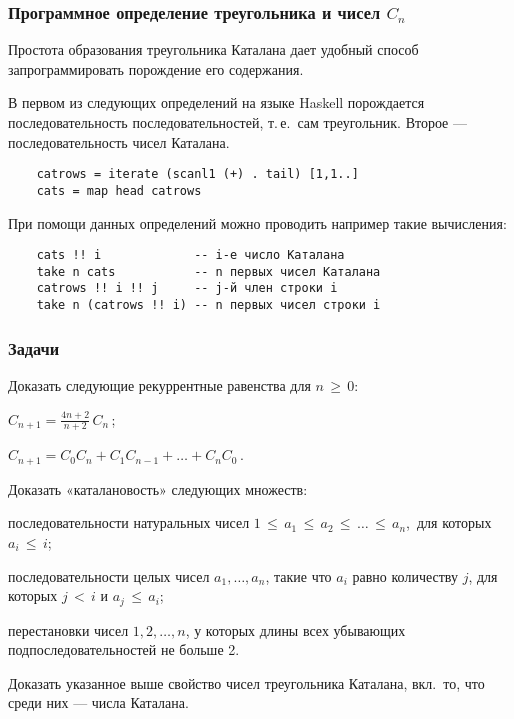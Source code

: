 \documentclass[mathserif]{beamer}
\newenvironment{items}[1][\labelitemi]{\begin{list}{#1}{\setlength{\topsep}{0pt}\setlength{\partopsep}{0pt}\setlength{\parsep}{0pt}\setlength{\itemsep}{\parskip}}}{\end{list}}
\begin{document}
\begin{frame}[fragile]%
\frametitle{Программное определение треугольника и чисел $C_n$}
Простота образования треугольника Каталана дает удобный способ запрограммировать порождение его содержания.

\medskip

В первом из следующих определений на языке Haskell порождается последовательность последовательностей, т.\,е.\ сам треугольник.
Второе — последовательность чисел Каталана.

\begin{verbatim}
    catrows = iterate (scanl1 (+) . tail) [1,1..]
    cats = map head catrows
\end{verbatim}

При помощи данных определений можно проводить например такие вычисления:

\begin{verbatim}
    cats !! i             -- i-е число Каталана
    take n cats           -- n первых чисел Каталана
    catrows !! i !! j     -- j-й член строки i
    take n (catrows !! i) -- n первых чисел строки i
\end{verbatim}
\end{frame}

\begin{frame}[fragile]%
\frametitle{Задачи}
Доказать следующие рекуррентные равенства для $n\,{\ge}\,0$:

\smallskip

\begin{items}[•]
\item $C_{n+1}=\frac{4n+2}{n+2}\,C_n$\,;
\item $C_{n+1}=C_0C_n+C_1C_{n-1}+\dots+C_nC_0$\,.
\end{items}

\bigskip

Доказать «каталановость» следующих множеств:
\begin{items}[•]
\item последовательности натуральных чисел $1\,{\le}\,a_1\,{\le}\,a_2\,{\le}\,\dots\,{\le}\,a_n$,\, для которых \,$a_i\,{\le}\,i$;
\item последовательности целых чисел $a_1,\dots,a_n$, такие что $a_i$ равно количеству $j$, для которых $j\,{<}\,i$ и $a_j\,{\le}\,a_i$;
\item перестановки чисел $1,2,\dots,n$, у которых длины всех убывающих подпоследовательностей не больше 2.
\end{items}

\bigskip

Доказать указанное выше свойство чисел треугольника Каталана, вкл.\ то, что среди них — числа Каталана.
\end{frame}
\end{document}
